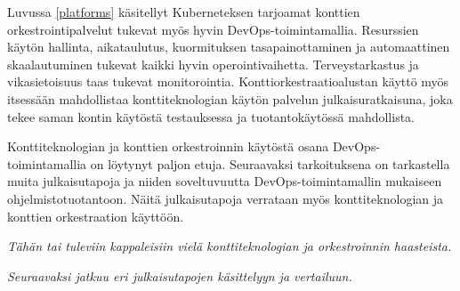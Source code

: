 Luvussa \ref{platforms} käsitellyt Kuberneteksen tarjoamat konttien orkestrointipalvelut tukevat myös hyvin DevOps-toimintamallia.
Resurssien käytön hallinta, aikataulutus, kuormituksen tasapainottaminen ja automaattinen skaalautuminen tukevat kaikki hyvin operointivaihetta.
Terveystarkastus ja vikasietoisuus taas tukevat monitorointia.
Konttiorkestraatioalustan käyttö myös itsessään mahdollistaa konttiteknologian käytön palvelun julkaisuratkaisuna, joka tekee saman kontin käytöstä testauksessa ja tuotantokäytössä mahdollista.

Konttiteknologian ja konttien orkestroinnin käytöstä osana DevOps-toimintamallia on löytynyt paljon etuja.
Seuraavaksi tarkoituksena on tarkastella muita julkaisutapoja ja niiden soveltuvuutta DevOps-toimintamallin mukaiseen ohjelmistotuotantoon.
Näitä julkaisutapoja verrataan myös konttiteknologian ja konttien orkestraation käyttöön.

\textit{Tähän tai tuleviin kappaleisiin vielä konttiteknologian ja orkestroinnin haasteista.}

\textit{Seuraavaksi jatkuu eri julkaisutapojen käsittelyyn ja vertailuun.}
